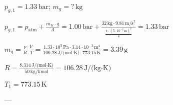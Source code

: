 \( p_{g,1} = 1.33 \, \text{bar} \); \( m_g = ? \, \text{kg} \)  

\( p_{g,1} = p_{\text{atm}} + \frac{m_K \cdot g}{A} = 1.00 \, \text{bar} + \frac{32 \, \text{kg} \cdot 9.81 \, \text{m/s}^2}{\frac{\pi \cdot (5 \cdot 10^{-2} \, \text{m})^2}{4}} = 1.33 \, \text{bar} \)  

\( m_g = \frac{p \cdot V}{R \cdot T} = \frac{1.33 \cdot 10^5 \, \text{Pa} \cdot 3.14 \cdot 10^{-3} \, \text{m}^3}{106.28 \, \text{J/(mol·K)} \cdot 773.15 \, \text{K}} = 3.39 \, \text{g} \)  

\( R = \frac{8.314 \, \text{J/(mol·K)}}{50 \, \text{kg/kmol}} = 106.28 \, \text{J/(kg·K)} \)  

\( T_1 = 773.15 \, \text{K} \)  

---